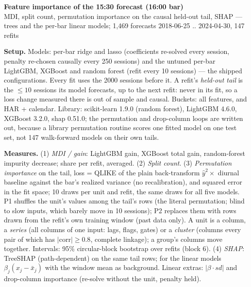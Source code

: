 \documentclass[10pt]{article}
\begin{document}
\begin{center}{\Large\bf Feature importance of the 15:30 forecast (16:00 bar)}\\[3pt]
{\small MDI, split count, permutation importance on the causal held-out tail, SHAP --- trees and the per-bar linear models; 1,469 forecasts 2018-06-25 .. 2024-04-30, 147 refits}\end{center}

\textbf{Setup.} Models: per-bar ridge and lasso (coefficients re-solved every session, penalty re-chosen causally every 250 sessions) and the untuned per-bar LightGBM, XGBoost and random forest (refit every 10 sessions) --- the shipped configurations. Every fit uses the 2000 sessions before it. A refit's \emph{held-out tail} is the $\le 10$ sessions its model forecasts, up to the next refit: never in its fit, so a loss change measured there is out of sample and causal. Buckets: all features, and HAR + calendar. Library: scikit-learn 1.9.0 (random forest), LightGBM 4.6.0, XGBoost 3.2.0, shap 0.51.0; the permutation and drop-column loops are written out, because a library permutation routine scores one fitted model on one test set, not 147 walk-forward models on their own tails.

\textbf{Measures.} (1) \emph{MDI / gain}: LightGBM gain, XGBoost total gain, random-forest impurity decrease; share per refit, averaged. (2) \emph{Split count}. (3) \emph{Permutation importance} on the tail, loss = QLIKE of the plain back-transform $\hat y^2\times$ diurnal baseline against the bar's realized variance (no recalibration), and squared error in the fit space; 10 draws per unit and refit, the same draws for all five models. P1 shuffles the unit's values among the tail's rows (the literal permutation; blind to slow inputs, which barely move in 10 sessions); P2 replaces them with rows drawn from the refit's own training window (past data only). A unit is a column, a \emph{series} (all columns of one input: lags, flags, gates) or a \emph{cluster} (columns every pair of which has $|$corr$|\ge 0.8$, complete linkage); a group's columns move together. Intervals: 95\% circular-block bootstrap over refits (block 6). (4) \emph{SHAP}: TreeSHAP (path-dependent) on the same tail rows; for the linear models $\beta_j(x_j-\bar x_j)$ with the window mean as background. Linear extras: $|\beta\cdot sd|$ and drop-column importance (re-solve without the unit, penalty held).
\end{document}
